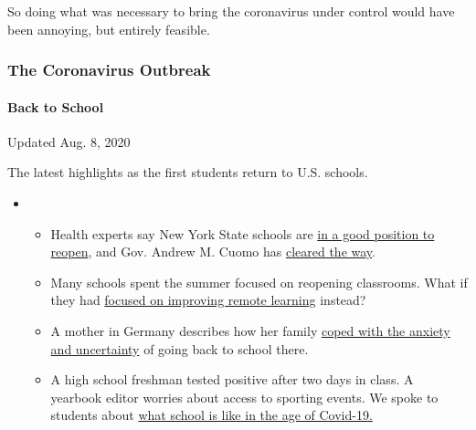 So doing what was necessary to bring the coronavirus under control would
have been annoying, but entirely feasible.

\hypertarget{the-coronavirus-outbreak}{%
\subsubsection{The Coronavirus
Outbreak}\label{the-coronavirus-outbreak}}

\hypertarget{back-to-school}{%
\paragraph{Back to School}\label{back-to-school}}

Updated Aug. 8, 2020

The latest highlights as the first students return to U.S. schools.

\begin{itemize}
\item
  \begin{itemize}
  \tightlist
  \item
    Health experts say New York State schools are
    \href{https://www.nytimes.com/2020/08/07/health/coronavirus-ny-schools-reopen.html?action=click\&pgtype=Article\&state=default\&region=MAIN_CONTENT_2\&context=storylines_keepup}{in
    a good position to reopen}, and Gov. Andrew M. Cuomo has
    \href{https://www.nytimes.com/2020/08/07/nyregion/cuomo-schools-reopening.html?action=click\&pgtype=Article\&state=default\&region=MAIN_CONTENT_2\&context=storylines_keepup}{cleared
    the way}.
  \item
    Many schools spent the summer focused on reopening classrooms. What
    if they had
    \href{https://www.nytimes.com/2020/08/07/us/remote-learning-fall-2020.html?action=click\&pgtype=Article\&state=default\&region=MAIN_CONTENT_2\&context=storylines_keepup}{focused
    on improving remote learning} instead?
  \item
    A mother in Germany describes how her family
    \href{https://www.nytimes.com/2020/08/07/parenting/germany-schools-reopening-children.html?action=click\&pgtype=Article\&state=default\&region=MAIN_CONTENT_2\&context=storylines_keepup}{coped
    with the anxiety and uncertainty} of going back to school there.
  \item
    A high school freshman tested positive after two days in class. A
    yearbook editor worries about access to sporting events. We spoke to
    students about
    \href{https://www.nytimes.com/2020/08/06/us/coronavirus-students.html?action=click\&pgtype=Article\&state=default\&region=MAIN_CONTENT_2\&context=storylines_keepup}{what
    school is like in the age of Covid-19.}
  \end{itemize}
\end{itemize}

